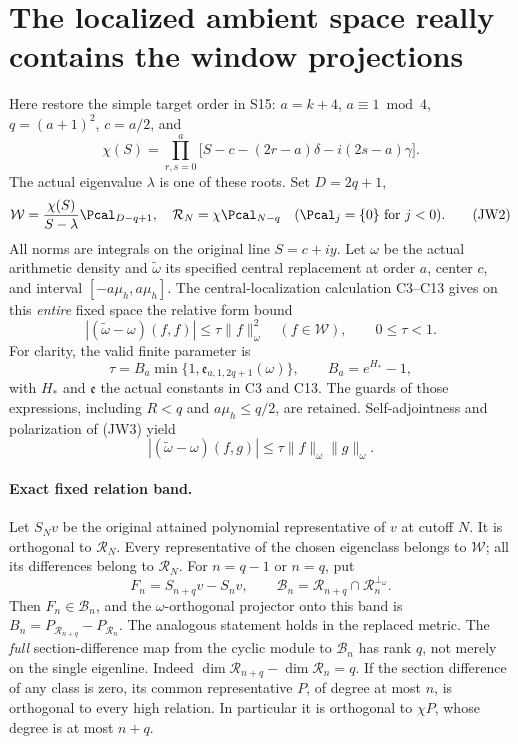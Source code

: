 \section{The localized ambient space really contains the window projections}

Here restore the simple target order in S15: \(a=k+4\),
\(a\equiv1\bmod4\), \(q=(a+1)^2\), \(c=a/2\), and
\[
\chi(S)=\prod_{r,s=0}^{a}
\bigl[S-c-(2r-a)\delta-i(2s-a)\gamma\bigr].
\tag{JW1}
\]
The actual eigenvalue \(\lambda\) is one of these roots.
Set \(D=2q+1\),
\[
\mathcal W=\frac{\chi(S)}{S-\lambda}\Pcal_{D-q+1},
\quad
\mathcal R_N=\chi\Pcal_{N-q}
\quad (\Pcal_j=\{0\}\text{ for }j<0).
\tag{JW2}
\]
All norms are integrals on the original line \(S=c+iy\).
Let \(\omega\) be the actual arithmetic density and
\(\widetilde\omega\) its specified central replacement at order \(a\),
center \(c\), and interval \([-a\mu_h,a\mu_h]\).
The central-localization calculation C3--C13 gives on this \emph{entire}
fixed space the relative form bound
\[
|(\widetilde\omega-\omega)(f,f)|\le\tau\|f\|_\omega^2
\quad(f\in\mathcal W),\qquad 0\le\tau<1.
\tag{JW3}
\]
For clarity, the valid finite parameter is
\[
\tau=B_a\min\{1,\mathfrak e_{a,1,2q+1}(\omega)\},
\qquad
B_a=e^{H_*}-1,
\tag{JW4}
\]
with \(H_*\) and \(\mathfrak e\) the actual constants in C3 and C13.
The guards of those expressions, including \(R<q\) and \(a\mu_h\le q/2\),
are retained.  Self-adjointness and polarization of (JW3) yield
\[
|(\widetilde\omega-\omega)(f,g)|
\le\tau\|f\|_\omega\|g\|_\omega.
\tag{JW5}
\]

\paragraph{Exact fixed relation band.}
Let \(S_Nv\) be the original attained polynomial representative of \(v\)
at cutoff \(N\).  It is orthogonal to \(\mathcal R_N\).
Every representative of the chosen eigenclass belongs to \(\mathcal W\);
all its differences belong to \(\mathcal R_N\).
For \(n=q-1\) or \(n=q\), put
\[
F_n=S_{n+q}v-S_nv,\qquad
\mathcal B_n=\mathcal R_{n+q}\cap\mathcal R_n^{\perp_\omega}.
\tag{JW6}
\]
Then \(F_n\in\mathcal B_n\), and the \(\omega\)-orthogonal projector onto
this band is \(B_n=P_{\mathcal R_{n+q}}-P_{\mathcal R_n}\).
The analogous statement holds in the replaced metric.
The \emph{full} section-difference map from the cyclic module to
\(\mathcal B_n\) has rank \(q\), not merely on the single eigenline.
Indeed
\(\dim\mathcal R_{n+q}-\dim\mathcal R_n=q\).
If the section difference of any class is zero, its common representative
\(P\), of degree at most \(n\), is orthogonal to every high relation.
In particular it is orthogonal to \(\chi P\), whose degree is at most
\(n+q\).

